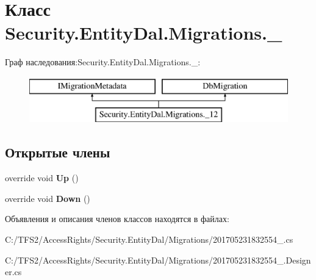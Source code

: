 \hypertarget{class_security_1_1_entity_dal_1_1_migrations_1_1__12}{}\section{Класс Security.\+Entity\+Dal.\+Migrations.\+\_}
\label{class_security_1_1_entity_dal_1_1_migrations_1_1__12}
Граф наследования\+:Security.\+Entity\+Dal.\+Migrations.\+\_\+:\begin{figure}[H]
\begin{center}
\leavevmode
\includegraphics[height=2.000000cm]{d8/df5/class_security_1_1_entity_dal_1_1_migrations_1_1__12}
\end{center}
\end{figure}
\subsection*{Открытые члены}
\begin{DoxyCompactItemize}
\item 
\mbox{\label{class_security_1_1_entity_dal_1_1_migrations_1_1__12_a26e42ab3123b870de590c49b7209b242}} 
override void {\bfseries Up} ()
\item 
\mbox{\label{class_security_1_1_entity_dal_1_1_migrations_1_1__12_aa064a25693428c8a7b802ccc1144282d}} 
override void {\bfseries Down} ()
\end{DoxyCompactItemize}


Объявления и описания членов классов находятся в файлах\+:\begin{DoxyCompactItemize}
\item 
C\+:/\+T\+F\+S2/\+Access\+Rights/\+Security.\+Entity\+Dal/\+Migrations/201705231832554\+\_.\+cs\item 
C\+:/\+T\+F\+S2/\+Access\+Rights/\+Security.\+Entity\+Dal/\+Migrations/201705231832554\+\_.\+Designer.\+cs\end{DoxyCompactItemize}
